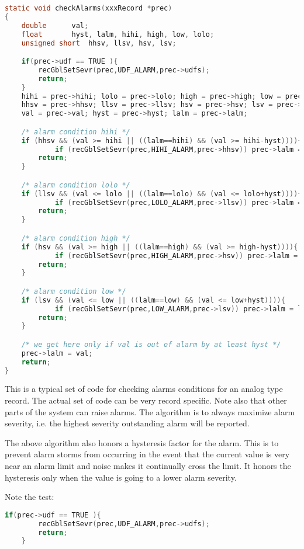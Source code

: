 \begin{lstlisting}[language=C]
static void checkAlarms(xxxRecord *prec)
{
	double		val;
	float		hyst, lalm, hihi, high, low, lolo;
	unsigned short	hhsv, llsv, hsv, lsv;

	if(prec->udf == TRUE ){
		recGblSetSevr(prec,UDF_ALARM,prec->udfs);
		return;
	}
	hihi = prec->hihi; lolo = prec->lolo; high = prec->high; low = prec->low;
	hhsv = prec->hhsv; llsv = prec->llsv; hsv = prec->hsv; lsv = prec->lsv;
	val = prec->val; hyst = prec->hyst; lalm = prec->lalm;

	/* alarm condition hihi */
	if (hhsv && (val >= hihi || ((lalm==hihi) && (val >= hihi-hyst)))){
	        if (recGblSetSevr(prec,HIHI_ALARM,prec->hhsv)) prec->lalm = hihi;
		return;
	}

	/* alarm condition lolo */
	if (llsv && (val <= lolo || ((lalm==lolo) && (val <= lolo+hyst)))){
	        if (recGblSetSevr(prec,LOLO_ALARM,prec->llsv)) prec->lalm = lolo;
		return;
	}

	/* alarm condition high */
	if (hsv && (val >= high || ((lalm==high) && (val >= high-hyst)))){
	        if (recGblSetSevr(prec,HIGH_ALARM,prec->hsv)) prec->lalm = high;
		return;
	}

	/* alarm condition low */
	if (lsv && (val <= low || ((lalm==low) && (val <= low+hyst)))){
	        if (recGblSetSevr(prec,LOW_ALARM,prec->lsv)) prec->lalm = low;
		return;
	}

	/* we get here only if val is out of alarm by at least hyst */
	prec->lalm = val;
	return;
}
\end{lstlisting}

This is a typical set of code for checking alarms conditions for an analog type record.
The actual set of code can be very record specific.
Note also that other parts of the system can raise alarms.
The algorithm is to always maximize alarm severity, i.e. the highest severity outstanding alarm will be reported.

The above algorithm also honors a hysteresis factor for the alarm.
This is to prevent alarm storms from occurring in the event that the current value is very near an alarm limit and noise makes it continually cross the limit.
It honors the hysteresis only when the value is going to a lower alarm severity.

Note the test:

\begin{lstlisting}[language=C]
	if(prec->udf == TRUE ){
		recGblSetSevr(prec,UDF_ALARM,prec->udfs);
		return;
	}
\end{lstlisting}

